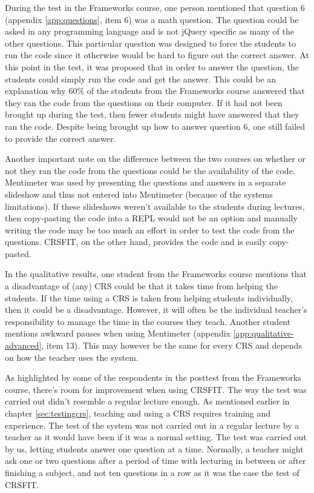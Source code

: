 During the test in the Frameworks course, one person mentioned that question 6 (appendix \ref{app:questions}, item 6) was a math question. The question could be asked in any programming language and is not jQuery specific as many of the other questions. This particular question was designed to force the students to run the code since it otherwise would be hard to figure out the correct answer. At this point in the test, it was proposed that in order to answer the question, the students could simply run the code and get the answer. This could be an explanation why 60\% of the students from the Frameworks course answered that they ran the code from the questions on their computer. If it had not been brought up during the test, then fewer students might have answered that they ran the code. Despite being brought up how to answer question 6, one still failed to provide the correct answer.

Another important note on the difference between the two courses on whether or not they ran the code from the questions could be the availability of the code. Mentimeter was used by presenting the questions and answers in a separate slideshow and thus not entered into Mentimeter (because of the systems limitations). If these slideshows weren't available to the students during lectures, then copy-pasting the code into a REPL would not be an option and manually writing the code may be too much an effort in order to test the code from the questions. CRSFIT, on the other hand, provides the code and is easily copy-pasted.




In the qualitative results, one student from the Frameworks course mentions that a disadvantage of (any) CRS could be that it takes time from helping the students. If the time using a CRS is taken from helping students individually, then it could be a disadvantage. However, it will often be the individual teacher's responsibility to manage the time in the courses they teach. Another student mentions awkward pauses when using Mentimeter (appendix \ref{app:qualitative-advanced}, item 13). This may however be the same for every CRS and depends on how the teacher uses the system. 




As highlighted by some of the respondents in the posttest from the Frameworks course, there's room for improvement when using CRSFIT. The way the test was carried out didn't resemble a regular lecture enough. As mentioned earlier in chapter \ref{sec:testingcrs}, teaching and using a CRS requires training and experience. The test of the system was not carried out in a regular lecture by a teacher as it would have been if it was a normal setting. The test was carried out by us, letting students answer one question at a time. Normally, a teacher might ask one or two questions after a period of time with lecturing in between or after finishing a subject, and not ten questions in a row as it was the case the test of CRSFIT.



